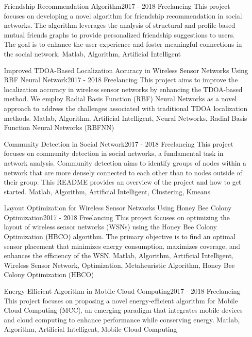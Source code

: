
\begin{projects}
	\project
	{Friendship Recommendation Algorithm}{2017 - 2018}
	{ {Freelancing} }
	{This project focuses on developing a novel algorithm for friendship recommendation in social networks. The algorithm leverages the analysis of structural and profile-based mutual friends graphs to provide personalized friendship suggestions to users. The goal is to enhance the user experience and foster meaningful connections in the social network.}
	{Matlab, Algorithm, Artificial Intelligent}
				
	\project
	{Improved TDOA-Based Localization Accuracy in Wireless Sensor Networks Using RBF Neural Network}{2017 - 2018}
	{ {Freelancing} }
	{This project aims to improve the localization accuracy in wireless sensor networks by enhancing the TDOA-based method. We employ Radial Basis Function (RBF) Neural Networks as a novel approach to address the challenges associated with traditional TDOA localization methods.}
	{Matlab, Algorithm, Artificial Intelligent, Neural Networks, Radial Basis Function Neural Networks (RBFNN)}

	\project
	{Community Detection in Social Network}{2017 - 2018}
	{ {Freelancing} }
	{This project focuses on community detection in social networks, a fundamental task in network analysis. Community detection aims to identify groups of nodes within a network that are more densely connected to each other than to nodes outside of their group. This README provides an overview of the project and how to get started.}
	{Matlab, Algorithm, Artificial Intelligent, Clustering, Kmeans}

	\project
	{Layout Optimization for Wireless Sensor Networks Using Honey Bee Colony Optimization}{2017 - 2018}
	{ {Freelancing} }
	{This project focuses on optimizing the layout of wireless sensor networks (WSNs) using the Honey Bee Colony Optimization (HBCO) algorithm. The primary objective is to find an optimal sensor placement that minimizes energy consumption, maximizes coverage, and enhances the efficiency of the WSN.}
	{Matlab, Algorithm, Artificial Intelligent, Wireless Sensor Network, Optimization, Metaheuristic Algorithm, Honey Bee Colony Optimization (HBCO)}

	\project
	{Energy-Efficient Algorithm in Mobile Cloud Computing}{2017 - 2018}
	{ {Freelancing} }
	{This project focuses on proposing a novel energy-efficient algorithm for Mobile Cloud Computing (MCC), an emerging paradigm that integrates mobile devices and cloud computing to enhance performance while conserving energy.}
	{Matlab, Algorithm, Artificial Intelligent, Mobile Cloud Computing}


\end{projects}